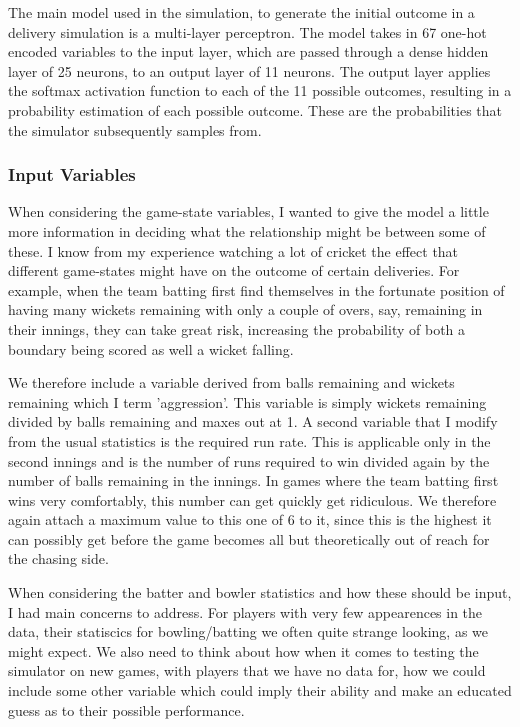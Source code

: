The main model used in the simulation, to generate the initial outcome in a delivery simulation is a multi-layer perceptron. The model takes in 67 one-hot encoded variables to the input layer, which are passed through a dense hidden layer of 25 neurons, to an output layer of 11 neurons. The output layer applies the softmax activation function to each of the 11 possible outcomes, resulting in a probability estimation of each possible outcome. These are the probabilities that the simulator subsequently samples from.

\subsubsection{Input Variables}

When considering the game-state variables, I wanted to give the model a little more information in deciding what the relationship might be between some of these. I know from my experience watching a lot of cricket the effect that different game-states might have on the outcome of certain deliveries. For example, when the team batting first find themselves in the fortunate position of having many wickets remaining with only a couple of overs, say, remaining in their innings, they can take great risk, increasing the probability of both a boundary being scored as well a wicket falling.

We therefore include a variable derived from balls remaining and wickets remaining which I term 'aggression'. This variable is simply wickets remaining divided by balls remaining and maxes out at 1. A second variable that I modify from the usual statistics is the required run rate. This is applicable only in the second innings and is the number of runs required to win divided again by the number of balls remaining in the innings. In games where the team batting first wins very comfortably, this number can get quickly get ridiculous. We therefore again attach a maximum value to this one of 6 to it, since this is the highest it can possibly get before the game becomes all but theoretically out of reach for the chasing side.

When considering the batter and bowler statistics and how these should be input, I had main concerns to address. For players with very few appearences in the data, their statiscics for bowling/batting we often quite strange looking, as we might expect. We also need to think about how when it comes to testing the simulator on new games, with players that we have no data for, how we could include some other variable which could imply their ability and make an educated guess as to their possible performance.


